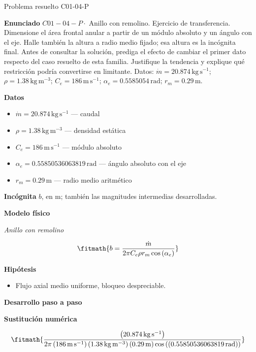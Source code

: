 \documentclass[10pt,openany]{book}
\begin{document}
\begin{studiumworked}{Problema resuelto C01-04-P}


\noindent\textbf{Enunciado}
\(C01-04-P \cdot\) Anillo con remolino. Ejercicio de transferencia. Dimensione el área frontal anular a partir de un módulo absoluto y un ángulo con el eje. Halle también la altura a radio medio fijado; esa altura es la incógnita final. Antes de consultar la solución, prediga el efecto de cambiar el primer dato respecto del caso resuelto de esta familia. Justifique la tendencia y explique qué restricción podría convertirse en limitante. Datos: \(\dot m=20.874\, \mathrm{kg}\,\mathrm{s}^{-1}\); \(\rho=1.38\, \mathrm{kg}\,\mathrm{m}^{-3}\); \(C_e=186\, \mathrm{m}\,\mathrm{s}^{-1}\); \(\alpha_e=0.5585054\, \mathrm{rad}\); \(r_m=0.29\, \mathrm{m}\).

\noindent\textbf{Datos}
\begin{itemize}
\item $\dot m = 20.874\,\mathrm{kg}\,\mathrm{s}^{-1}$ — caudal
\item $\rho = 1.38\,\mathrm{kg}\,\mathrm{m}^{-3}$ — densidad estática
\item $C_e = 186\,\mathrm{m}\,\mathrm{s}^{-1}$ — módulo absoluto
\item $\alpha_e = 0.55850536063819\,\mathrm{rad}$ — ángulo absoluto con el eje
\item $r_m = 0.29\,\mathrm{m}$ — radio medio aritmético
\end{itemize}

\noindent\textbf{Incógnita}
$b$, en $\mathrm{m}$; también las magnitudes intermedias desarrolladas.

\noindent\textbf{Modelo físico}

\noindent\textit{Anillo con remolino}

\[
\fitmath{b=\frac{\dot m}{2 \pi C_e \rho r_m \cos{\left(\alpha_e \right)}}}
\]

\noindent\textbf{Hipótesis}
\begin{itemize}
\item Flujo axial medio uniforme, bloqueo despreciable.
\end{itemize}

\noindent\textbf{Desarrollo paso a paso}



\noindent\textbf{Sustitución numérica}

\[
\fitmath{\frac{\left(20.874\,\mathrm{kg}\,\mathrm{s}^{-1}\right)}{2 \pi \left(186\,\mathrm{m}\,\mathrm{s}^{-1}\right) \left(1.38\,\mathrm{kg}\,\mathrm{m}^{-3}\right) \left(0.29\,\mathrm{m}\right) \cos{\left(\left(0.55850536063819\,\mathrm{rad}\right) \right)}}}
\]


\end{studiumworked}
\end{document}
